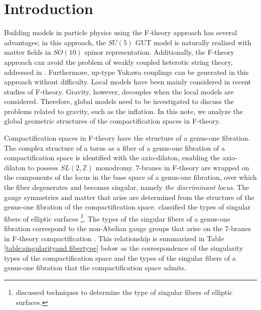 \documentclass[12pt]{article}
\def\Z{\mathbb{Z}}
\begin{document}
\section{Introduction}
\par Building models in particle physics using the F-theory \cite{Vaf, MV1, MV2} approach has several advantages; in this approach, the $SU(5)$ GUT model is naturally realized with matter fields in $SO(10)$ spinor representation. Additionally, the F-theory approach can avoid the problem of weakly coupled heterotic string theory, addressed in \cite{Witten}. Furthermore, up-type Yukawa couplings can be generated in this approach without difficulty. Local models \cite{DWmodel, BHV1, BHV2, DWGUT} have been mainly considered in recent studies of F-theory. Gravity, however, decouples when the local models are considered. Therefore, global models need to be investigated to discuss the problems related to gravity, such as the inflation. In this note, we analyze the global geometric structures of the compactification spaces in F-theory. 
\par Compactification spaces in F-theory have the structure of a genus-one fibration. The complex structure of a torus as a fiber of a genus-one fibration of a compactification space is identified with the axio-dilaton, enabling the axio-dilaton to possess $SL(2,\Z)$ monodromy. 7-branes in F-theory are wrapped on the components of the locus in the base space of a genus-one fibration, over which the fiber degenerates and becomes singular, namely {\it the discriminant locus}. The gauge symmetries and matter that arise are determined from the structure of the genus-one fibration of the compactification space. \cite{Kod1, Kod2} classified the types of singular fibers of elliptic surfaces \footnote{\cite{Ner, Tate} discussed techniques to determine the type of singular fibers of elliptic surfaces.}. The types of the singular fibers of a genus-one fibration correspond to the non-Abelian gauge groups that arise on the 7-branes in F-theory compactification \cite{MV2, BIKMSV}. This relationship is summarized in Table \ref{table:singularityand fibertype} below as the correspondence of the singularity types of the compactification space and the types of the singular fibers of a genus-one fibration that the compactification space admits. 
\end{document}
